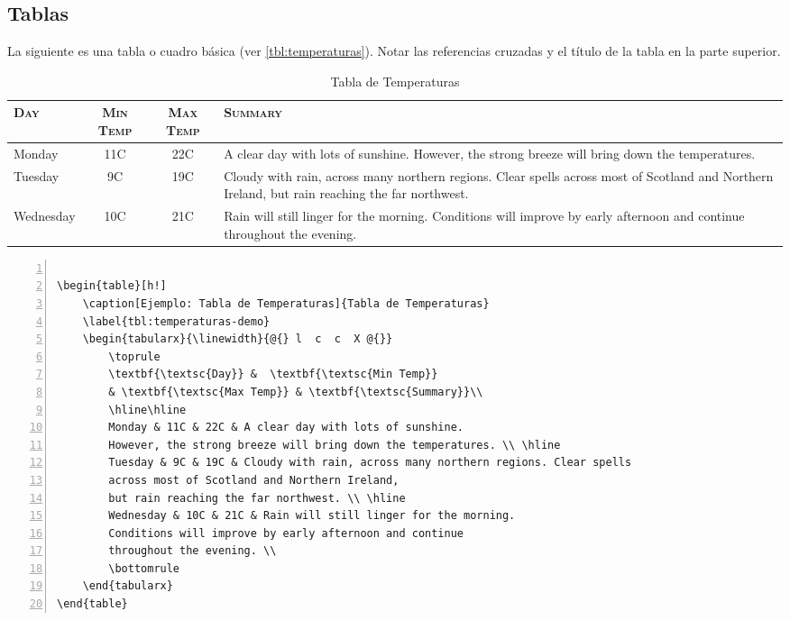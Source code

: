 \subsection{Tablas}

La siguiente es una tabla o cuadro básica (ver \autoref{tbl:temperaturas}). Notar las referencias cruzadas y el título de la tabla en la parte superior.

\begin{table}[h!]
    \caption[Ejemplo: Tabla de Temperaturas]{Tabla de Temperaturas}
    \label{tbl:temperaturas}
    \begin{tabularx}{\linewidth}{@{} l  c  c  X @{}}
        \toprule
        \textbf{\textsc{Day}} &  \textbf{\textsc{Min Temp}} 
        		& \textbf{\textsc{Max Temp}} & \textbf{\textsc{Summary}}\\
    	  \hline\hline
        Monday & 11C & 22C & A clear day with lots of sunshine.
        However, the strong breeze will bring down the temperatures. \\ \hline
        Tuesday & 9C & 19C & Cloudy with rain, across many northern regions. Clear spells
        across most of Scotland and Northern Ireland,
        but rain reaching the far northwest. \\ \hline
        Wednesday & 10C & 21C & Rain will still linger for the morning.
        Conditions will improve by early afternoon and continue
        throughout the evening. \\
        \bottomrule
    \end{tabularx}
\end{table}

\begin{Verbatim}[frame=lines, label=\autoref{tbl:temperaturas} Alternative
				, fontsize=\footnotesize, numbers=left
				, baselinestretch=1
				, formatcom=\color{gray}]

\begin{table}[h!]
    \caption[Ejemplo: Tabla de Temperaturas]{Tabla de Temperaturas}
    \label{tbl:temperaturas-demo}
    \begin{tabularx}{\linewidth}{@{} l  c  c  X @{}}
        \toprule
        \textbf{\textsc{Day}} &  \textbf{\textsc{Min Temp}} 
        & \textbf{\textsc{Max Temp}} & \textbf{\textsc{Summary}}\\
        \hline\hline
        Monday & 11C & 22C & A clear day with lots of sunshine.
        However, the strong breeze will bring down the temperatures. \\ \hline
        Tuesday & 9C & 19C & Cloudy with rain, across many northern regions. Clear spells
        across most of Scotland and Northern Ireland,
        but rain reaching the far northwest. \\ \hline
        Wednesday & 10C & 21C & Rain will still linger for the morning.
        Conditions will improve by early afternoon and continue
        throughout the evening. \\
        \bottomrule
    \end{tabularx}
\end{table}
\end{Verbatim}



